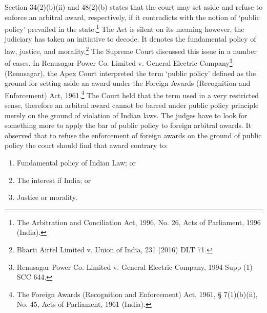 \begin{multicols}{2}
\vspace{-.1cm}


\vspace{-.1cm}

\noi
Section 34(2)(b)(ii) and 48(2)(b) states that the court may set aside and refuse to enforce an
arbitral award, respectively, if it contradicts with the notion of ‘public policy’ prevailed in the
state.\footnote{The Arbitration and Conciliation Act, 1996, No. 26, Acts of Parliament, 1996 (India).} The Act is silent on its meaning however, the judiciary has taken an initiative to decode. It denotes the fundamental policy of law, justice, and morality.\footnote{Bharti Airtel Limited v. Union of India, 231 (2016) DLT 71.} The Supreme Court
discussed this issue in a number of cases. In Renusagar Power Co. Limited v. General Electric
Company\footnote{Renusagar Power Co. Limited v. General Electric Company, 1994 Supp (1) SCC 644.} (Renusagar), the Apex Court interpreted the term ‘public policy’ defined as the
ground for setting aside an award under the Foreign Awards (Recognition and Enforcement)
Act, 1961.\footnote{The Foreign Awards (Recognition and Enforcement) Act, 1961, § 7(1)(b)(ii), No. 45, Acts of Parliament, 1961 (India).} The Court held that the term used in a very restricted sense, therefore an arbitral award cannot be barred under public policy principle merely on the ground of violation of Indian laws. The judges have to look for something more to apply the bar of public policy to
foreign arbitral awards. It observed that to refuse the enforcement of foreign awards on the
ground of public policy the court should find that award contrary to:

\vspace{-.2cm}

\begin{enumerate}[label=$(\alph*)$]
\itemsep=0pt
\item Fundamental policy of Indian Law; or

\item The interest if India; or

\item Justice or morality.
\end{enumerate}

\vspace{-.3cm}


\end{multicols}
